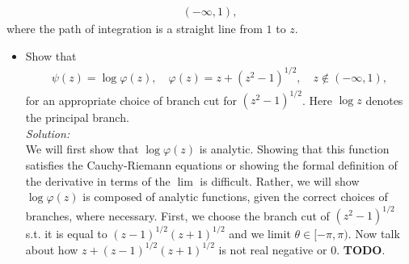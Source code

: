 \documentclass[10pt]{amsart}
\theoremstyle{nonumberplain}
\begin{document}
\begin{enumerate}[label={\bf {\arabic*}:}]
\begin{align*}
      (-\infty, 1),
    \end{align*}
    where the path of integration is a straight line from $1$ to $z$.
    \begin{itemize}
   \item  Show that
    \begin{align*}
      \psi(z) = \log \varphi(z), \quad \varphi(z) = z + (z^2 -
      1)^{1/2}, \quad z \not \in
      (-\infty, 1),
    \end{align*}
   for an appropriate choice of branch cut for $(z^2 -
   1)^{1/2}$.  Here $\log z$ denotes the principal branch. \\
   \textit{Solution:} \\
   We will first show that $\log \varphi(z)$ is analytic.
   Showing that this function satisfies the Cauchy-Riemann equations or showing the formal definition of the derivative in terms of the $\lim$ is difficult. 
   Rather, we will show $\log \varphi(z)$ is composed of analytic functions, given the correct choices of branches, where necessary.
   First, we choose the branch cut of $(z^2 - 1)^{1/2}$ s.t. it is equal to $(z - 1)^{1/2} (z + 1)^{1/2}$ and we limit $\theta \in [-\pi, \pi)$.
   Now talk about how $z + (z - 1)^{1/2} (z + 1)^{1/2}$ is not real negative or 0. \textbf{TODO}.


\end{itemize}
\end{enumerate}
\end{document}
